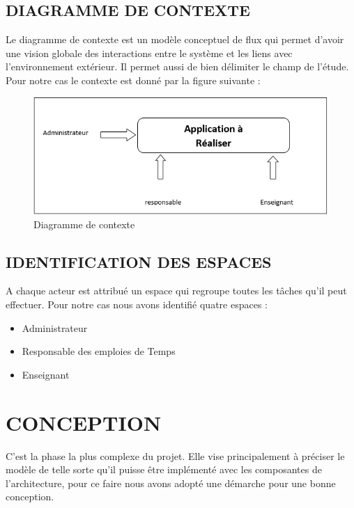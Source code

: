 \documentclass[english,12pt,a4paper]{report}
\begin{document}
\subsection{DIAGRAMME DE CONTEXTE}
Le diagramme de contexte est un modèle conceptuel de flux qui permet d’avoir
une vision globale des interactions entre le système et les liens avec
l’environnement extérieur. Il permet aussi de bien délimiter le champ de l’étude. Pour notre cas le contexte est donné par la figure suivante :
\begin{figure}[h]
	\centering
	\includegraphics[width=1\textwidth]{dContext.png}
	\caption{Diagramme de contexte}
	\label{fig1: diagramme de contexte}
\end{figure}

\subsection{IDENTIFICATION DES ESPACES}
A chaque acteur est attribué un espace qui regroupe toutes les tâches qu’il peut
effectuer. Pour notre cas nous avons identifié quatre espaces :
\begin{itemize}
	\item Administrateur
	\item Responsable des emploies de Temps
	\item Enseignant
\end{itemize}

\section{CONCEPTION}
C’est la phase la plus complexe du projet. Elle vise principalement à préciser le modèle de telle sorte qu’il puisse être implémenté avec les composantes de l’architecture, pour ce faire nous avons adopté une démarche pour une bonne conception.
\end{document}
